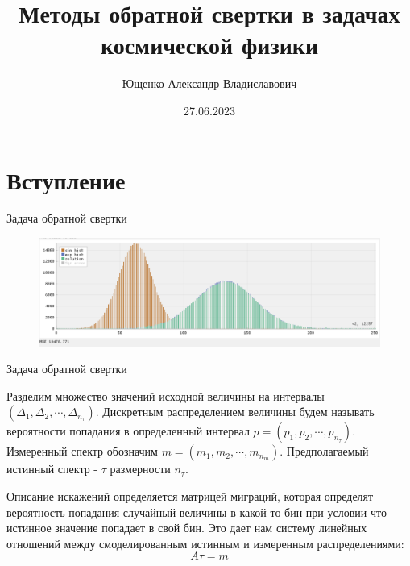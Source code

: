 \documentclass[fullscreen=true,russian,compress,%
	hyperref={unicode,bookmarks=false}]{presentation}
\begin{document}

\title[Методы обратной свертки в задачах космической физики]{Методы обратной свертки в задачах \\ космической физики}
\author{Ющенко Александр Владиславович}
\date{27.06.2023}

\begin{frame}
\titlepage
\end{frame}


\section{Вступление}


\begin{frame}{Задача обратной свертки}
   \begin{figure}[!ht]
      \includegraphics[width=\linewidth]{images/example_regulazation.png}
   \end{figure}
\end{frame}

\begin{frame}{Задача обратной свертки}
\begin{block}{}
   Разделим множество значений исходной величины на интервалы 
   $(\Delta_{1}, \Delta_{2}, \cdots ,\Delta_{n_{\tau}})$. Дискретным распределением величины будем называть вероятности попадания 
   в определенный интервал $p = (p_{1}, p_{2}, \cdots, p_{n_{\tau}})$. Измеренный спектр обозначим $m = (m_{1}, m_{2}, \cdots, m_{n_{m}})$.
   Предполагаемый истинный спектр - $\tau$ размерности $n_{\tau}$.
\end{block}
\begin{block}{}
   Описание искажений определяется матрицей миграций, которая определят вероятность попадания случайный величины в какой-то бин при 
   условии что истинное значение попадает в свой бин.
   Это дает нам систему линейных отношений между смоделированным истинным и измеренным распределениями: 
   \begin{equation}
      A\tau = m
   \end{equation}
\end{block}
\end{frame}
\end{document}

